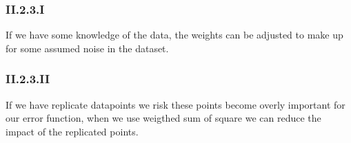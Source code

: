 \documentclass{article}
\begin{document}
\subsubsection{II.2.3.I}

If we have some knowledge of the data, the weights can be adjusted to make
up for some assumed noise in the dataset.

\subsubsection{II.2.3.II} 

If we have replicate datapoints we risk
these points become overly important for our error function, when we use
weigthed sum of square we can reduce the impact of the replicated points.
\end{document}
